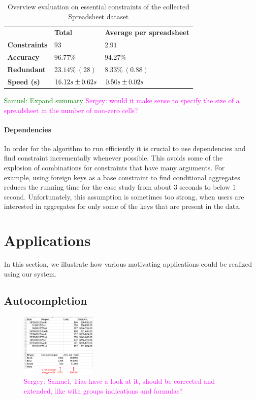 \documentclass{sig-alternate-05-2015}
\newcommand{\sergey}[1]{\textcolor{magenta}{{\sc Sergey:} #1}\xspace}
\newcommand{\samuel}[1]{\textcolor{green}{{\sc Samuel:} #1}\xspace}
\begin{document}
\begin{table}
  \centering
  \begin{tabular}{lll}
    & \textbf{Total} & \textbf{Average per spreadsheet} \\
    \textbf{Constraints} & $93$ & $2.91$ \\
    \textbf{Accuracy} & $96.77\%$ & $94.27\%$ \\
    \textbf{Redundant} & $23.14\%~(28)$ & $8.33\%~(0.88)$ \\
    \textbf{Speed (s)} & ${16.12}s \pm {0.62}s$ & ${0.50}s \pm {0.02}s$
  \end{tabular}
  \caption{Overview evaluation on essential constraints of the collected Spreadsheet dataset}
\end{table}
\samuel{Expand summary}
\sergey{would it make sense to specify the size of a spreadsheet in the number of non-zero cells?}

\paragraph{Dependencies}
In order for the algorithm to run efficiently it is crucial to use dependencies and find constraint incrementally whenever possible.
This avoids some of the explosion of combinations for constraints that have many arguments.
For example, using foreign keys as a base constraint to find conditional aggregates reduces the running time for the case study from about 3 seconds to below 1 second.
Unfortunately, this assumption is sometimes too strong, when users are interested in aggregates for only some of the keys that are present in the data.

\section{Applications}\label{sec:applications}
In this section, we illustrate how various motivating applications could be realized using our system.

\subsection{Autocompletion}
\begin{figure}[thb]
  \begin{center}
    \includegraphics[width=0.33\textwidth]{figures/autocompletion_example.png}
  \end{center}
  \caption{\sergey{Samuel, Tias have a look at it, should be corrected and extended, like with groups indications and formulas?}}
  \label{fig:autocompletion_example}
\end{figure}
\end{document}
